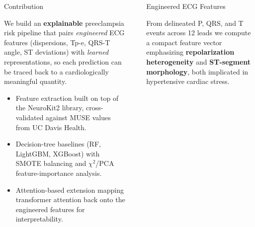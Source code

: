 \documentclass[final]{beamer}
\newlength{\sepwidth}
\newlength{\colwidth}
\newcommand{\separatorcolumn}{\begin{column}{\sepwidth}\end{column}}
\begin{document}
\begin{frame}[t]
\begin{columns}[t]
\begin{column}{\colwidth}
  \begin{alertblock}{Contribution}

    We build an \textbf{explainable} preeclampsia risk pipeline that pairs
    \emph{engineered} ECG features (dispersions, Tp-e, QRS-T angle,
    ST deviations) with \emph{learned} representations, so each prediction
    can be traced back to a cardiologically meaningful quantity.

    \begin{itemize}
      \item Feature extraction built on top of the NeuroKit2 library,
        cross-validated against MUSE values from UC Davis Health.
      \item Decision-tree baselines (RF, LightGBM, XGBoost) with SMOTE
        balancing and $\chi^2$/PCA feature-importance analysis.
      \item Attention-based extension mapping transformer attention back
        onto the engineered features for interpretability.
    \end{itemize}

  \end{alertblock}

\end{column}

\separatorcolumn

\begin{column}{\colwidth}

  \begin{block}{Engineered ECG Features}

    From delineated P, QRS, and T events across 12 leads we compute a
    compact feature vector emphasizing \textbf{repolarization heterogeneity}
    and \textbf{ST-segment morphology}, both implicated in hypertensive
    cardiac stress.


\end{block}
\end{column}
\end{columns}
\end{frame}
\end{document}
